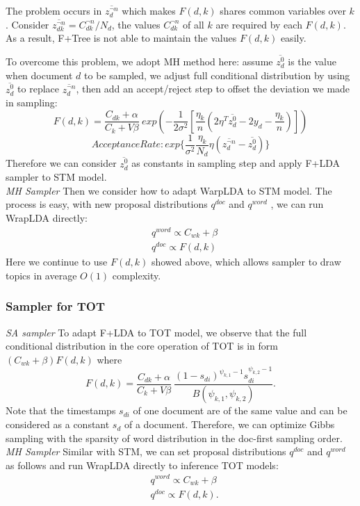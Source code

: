 \documentclass[10pt,journal,cspaper,compsoc]{IEEEtran}
\begin{document}
    The problem occurs in $\overline{z_d^{\neg n}}$ which makes $F(d,k)$ shares common variables over $k$.
    Consider $\overline{z_{dk}^{\neg n}}=C_{dk}^{\neg n}/N_d$, the values $C_{dk}^{\neg n}$ of all $k$ 
    are required by each $F(d,k)$. As a result, 
    F+Tree is not able to maintain the values $F(d,k)$ easily.
    
    To overcome this problem, we adopt MH method here:
    assume $\overline{z_{d}^0}$ is the value when document $d$ to be sampled, we adjust full conditional distribution by using $\overline{z_{d}^0}$ to replace $\overline{z_{d}^{\neg n}}$, then add an accept/reject step to offset the deviation we made in sampling: 
	$$F(d,k)=\frac{C_{dk}+\alpha}{C_{k}+V\beta}~
exp(-\frac{1}{2\sigma^2}
[\frac{\eta_k}{n}(2\eta^T\overline{z_{d}^0}-2y_d-\frac{\eta_k}{n})])$$
    $$Acceptance Rate: exp\{\frac{1}{\sigma^2}\frac{\eta_k}{N_d}\eta(\overline{z_{d}^{\neg n}}-\overline{z_{d}^0})\} $$
    Therefore we can consider $\overline{z_{d}^0}$ as
    constants in sampling step and apply F+LDA sampler
    to STM model.\\
    
    \noindent
    {\large \em MH Sampler} Then we consider how to adapt WarpLDA to STM model. The process is easy, with new proposal distributions $q^{doc}$ and $q^{word}$ , we can run WrapLDA directly:
    \begin{align*}
    &q^{word} \propto C_{wk}+\beta\\
    &q^{doc} \propto F(d,k)
    \end{align*}
    Here we continue to use $F(d,k)$ showed above, which allows sampler to draw topics in average $O(1)$ complexity.
	
	\subsubsection{Sampler for TOT}
	\noindent
	{\large \em SA sampler} To adapt F+LDA to TOT model, we observe that the full conditional distribution in the core operation of TOT is in form $(C_{wk}+\beta)F(d,k)$ where
	$$F(d,k)=\frac{C_{dk}+\alpha}{C_k+V\beta}~\frac{(1-s_{di})^{\psi_{k,1}-1}s_{di}^{\psi_{k,2}-1}}{B(\psi_{k,1},\psi_{k,2})}.$$
	Note that the timestamps $s_{di}$ of one
	document are of the same value and can be considered
	as a constant $s_d$ of a document. Therefore, we can optimize Gibbs sampling with the sparsity of word distribution in the doc-first sampling order. \\
	
    \noindent
    {\large \em MH Sampler} Similar with STM, we can set proposal distributions $q^{doc}$ and $q^{word}$ as follows and run WrapLDA
    directly to inference TOT models:
	\begin{align*}
    &q^{word} \propto C_{wk}+\beta\\
    &q^{doc} \propto F(d,k).
    \end{align*}
	
\end{document}

